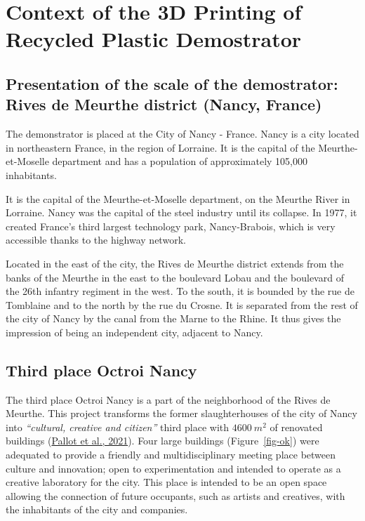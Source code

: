 \documentclass[
  11pt,
]{article}
\begin{document}
\hypertarget{context-of-the-3d-printing-of-recycled-plastic-demostrator}{%
\section{Context of the 3D Printing of Recycled Plastic
Demostrator}\label{context-of-the-3d-printing-of-recycled-plastic-demostrator}}

\hypertarget{presentation-of-the-scale-of-the-demostrator-rives-de-meurthe-district-nancy-france}{%
\subsection{Presentation of the scale of the demostrator: Rives de
Meurthe district (Nancy,
France)}\label{presentation-of-the-scale-of-the-demostrator-rives-de-meurthe-district-nancy-france}}

The demonstrator is placed at the City of Nancy - France. Nancy is a
city located in northeastern France, in the region of Lorraine. It is
the capital of the Meurthe-et-Moselle department and has a population of
approximately 105,000 inhabitants.

It is the capital of the Meurthe-et-Moselle department, on the Meurthe
River in Lorraine. Nancy was the capital of the steel industry until its
collapse. In 1977, it created France's third largest technology park,
Nancy-Brabois, which is very accessible thanks to the highway network.

Located in the east of the city, the Rives de Meurthe district extends
from the banks of the Meurthe in the east to the boulevard Lobau and the
boulevard of the 26th infantry regiment in the west. To the south, it is
bounded by the rue de Tomblaine and to the north by the rue du Crosne.
It is separated from the rest of the city of Nancy by the canal from the
Marne to the Rhine. It thus gives the impression of being an independent
city, adjacent to Nancy.

\hypertarget{third-place-octroi-nancy}{%
\subsection{Third place Octroi Nancy}\label{third-place-octroi-nancy}}

The third place Octroi Nancy is a part of the neighborhood of the Rives
de Meurthe. This project transforms the former slaughterhouses of the
city of Nancy into \emph{``cultural, creative and citizen''} third place
with \(4600~m^2\) of renovated buildings
(\protect\hyperlink{ref-pallot2021}{Pallot et al., 2021}). Four large
buildings (Figure~\ref{fig-ok}) were adequated to provide a friendly and
multidisciplinary meeting place between culture and innovation; open to
experimentation and intended to operate as a creative laboratory for the
city. This place is intended to be an open space allowing the connection
of future occupants, such as artists and creatives, with the inhabitants
of the city and companies.
\end{document}
